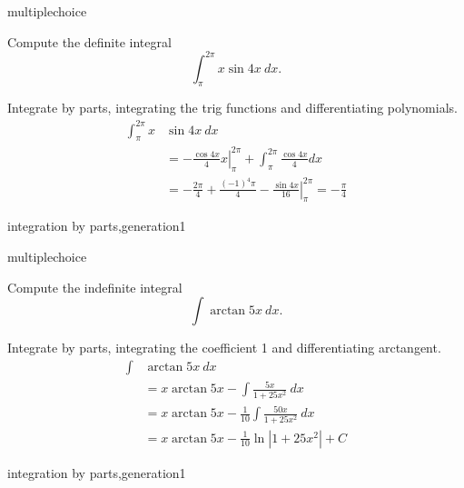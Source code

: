 \documentclass{ximera}
\begin{document}
\begin{question}
\begin{type}
multiplechoice
\end{type}
Compute the definite integral 
\[\int_{\pi}^{2 \pi} x \sin 4 x ~ dx.\]
\begin{multiplechoice}
\end{multiplechoice}
\begin{feedback}
Integrate by parts, integrating the trig functions and differentiating polynomials.
\[ \begin{aligned}
    \int_{\pi}^{2 \pi} x & \sin 4 x ~ dx \\
    & = \left. - \frac{\cos 4x}{4} x \right|_{\pi}^{2 \pi} + \int_{\pi}^{2 \pi} \frac{\cos 4x}{4} dx \\
    & = - \frac{2 \pi }{4} + \frac{(-1)^{4} \pi }{4} - \left. \frac{\sin 4x}{16} \right|_{\pi}^{2 \pi} = -\frac{\pi}{4}
\end{aligned}\]
\end{feedback}
\begin{keywords}
integration by parts,generation1
\end{keywords}
\end{question}
\begin{question}
\begin{type}
multiplechoice
\end{type}
Compute the indefinite integral 
\[\int \arctan 5x ~ dx.\]
\begin{multiplechoice}
\end{multiplechoice}
\begin{feedback}
Integrate by parts, integrating the coefficient 1 and differentiating arctangent.
\[\begin{aligned}
    \int & \arctan 5x ~ dx \\
    & = x \arctan 5x - \int \frac{5x}{1+25x^2} ~ dx \\
    & = x \arctan 5x - \frac{1}{10} \int \frac{50x}{1+25x^2} ~ dx \\
    & = x \arctan 5x - \frac{1}{10} \ln | 1 + 25x^2|  + C
\end{aligned}\]
\end{feedback}
\begin{keywords}
integration by parts,generation1
\end{keywords}
\end{question}
\end{document}

